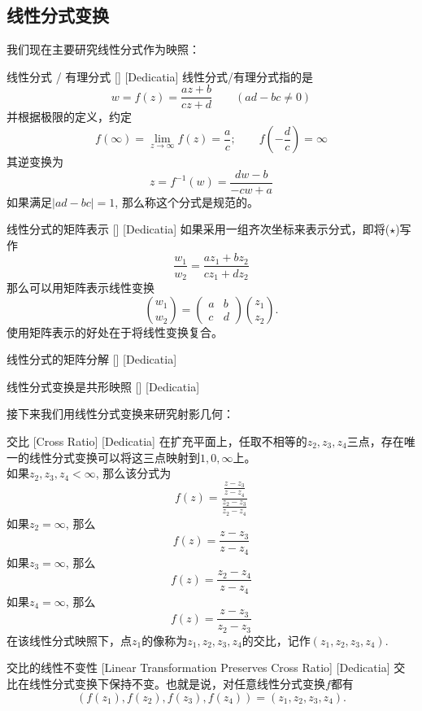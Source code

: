 \documentclass[UTF8]{ctexart}
\begin{document}
\subsection{线性分式变换}
我们现在主要研究线性分式作为映照：
\begin{dfn}
    [UUID]
    {线性分式 / 有理分式}
    []
    [Dedicatia]
    线性分式/有理分式指的是
    \[w=f(z)=\frac{az+b}{cz+d}\qquad(ad-bc\neq 0)\tag{$\star$}\]
    并根据极限的定义，约定
    \[f(\infty)=\lim_{z\to\infty}f(z)=\dfrac{a}{c};\qquad f\left(-\dfrac{d}{c}\right)=\infty\]
    其逆变换为
    \[z=f^{-1}(w)=\frac{dw-b}{-cw+a}\]
    如果满足$|ad-bc|=1$, 那么称这个分式是规范的。
\end{dfn}
\begin{ppt}
    [UUID]
    {线性分式的矩阵表示}
    []
    [Dedicatia]
    如果采用一组齐次坐标来表示分式，即将($\star$)写作
    \[\frac{w_1}{w_2}=\frac{az_1+bz_2}{cz_1+dz_2}\]
    那么可以用矩阵表示线性变换
    \[\binom{w_1}{w_2}=\begin{pmatrix}
        a&b\\c&d
    \end{pmatrix}\binom{z_1}{z_2}.\]
    使用矩阵表示的好处在于将线性变换复合。
\end{ppt}
\begin{ppt}
    [UUID]
    {线性分式的矩阵分解}
    []
    [Dedicatia]
\end{ppt}
\begin{ppt}
    [UUID]
    {线性分式变换是共形映照}
    []
    [Dedicatia]
\end{ppt}
接下来我们用线性分式变换来研究射影几何：
\begin{dfn}
    [UUID]
    {交比}
    [Cross Ratio]
    [Dedicatia]
    在扩充平面上，任取不相等的$z_2,z_3,z_4$三点，存在唯一的线性分式变换可以将这三点映射到$1,0,\infty$上。\\
    如果$z_2,z_3,z_4<\infty$, 那么该分式为
    \[f(z)=\frac{\frac{z-z_3}{z-z_4}}{\frac{z_2-z_3}{z_2-z_4}}\]
    如果$z_2=\infty$, 那么
    \[f(z)=\frac{z-z_3}{z-z_4}\]
    如果$z_3=\infty$, 那么
    \[f(z)=\frac{z_2-z_4}{z-z_4}\]
    如果$z_4=\infty$, 那么
    \[f(z)=\frac{z-z_3}{z_2-z_3}\]
    在该线性分式映照下，点$z_1$的像称为$z_1,z_2,z_3,z_4$的交比，记作$(z_1,z_2,z_3,z_4)$.
\end{dfn}
\begin{ppt}
    [UUID]
    {交比的线性不变性}
    [Linear Transformation Preserves Cross Ratio]
    [Dedicatia]
    交比在线性分式变换下保持不变。也就是说，对任意线性分式变换$f$都有
    \[(f(z_1),f(z_2),f(z_3),f(z_4))=(z_1,z_2,z_3,z_4).\]
\end{ppt}
\end{document}
